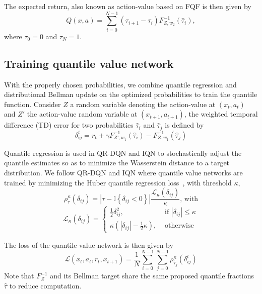 \documentclass{article}
\begin{document}
The expected return, also known as action-value based on FQF is then given by
\begin{equation*}
    Q(x, a)=\sum_{i=0}^{N-1}(\tau_{i+1}-\tau_{i})F^{-1}_{Z,w_2}(\hat{\tau}_i),
\end{equation*}
where $\tau_0=0$ and $\tau_{N}=1$.

\subsection{Training quantile value network}
With the properly chosen probabilities, we combine quantile regression and distributional Bellman update on the optimized probabilities to train the quantile function. Consider $Z$ a random variable denoting the action-value at $(x_t,a_t)$ and $Z'$ the action-value random variable at $(x_{t+1},a_{t+1})$, the weighted temporal difference (TD) error for two probabilities $\hat{\tau}_i$ and $\hat{\tau}_j$ is defined by
\begin{equation}
    \delta_{ij}^t=r_t+\gamma F^{-1}_{Z',w_1}(\hat{\tau}_i)-F^{-1}_{Z,w_1}(\hat{\tau}_j)
\end{equation}

Quantile regression is used in QR-DQN and IQN to stochastically adjust the quantile estimates so as to minimize the Wasserstein distance to a target distribution. We follow QR-DQN and IQN where quantile value networks are trained by minimizing the Huber quantile regression loss~\citep{huber:1964}, with threshold $\kappa$,
\begin{equation*}
    \rho_{\tau}^{\kappa}\left(\delta_{i j}\right)=\left|\tau-\mathbb{I}\left\{\delta_{i j}<0\right\}\right| \frac{\mathcal{L}_{\kappa}\left(\delta_{i j}\right)}{\kappa} \text{, with}
\end{equation*}
\begin{equation*}
    \mathcal{L}_{\kappa}\left(\delta_{i j}\right)=\left\{\begin{array}{ll}{\frac{1}{2} \delta_{i j}^{2},} & {\text { if }\left|\delta_{i j}\right| \leq \kappa} \\ {\kappa\left(\left|\delta_{i j}\right|-\frac{1}{2} \kappa\right),} & {\text { otherwise }}\end{array}\right.
\end{equation*}

The loss of the quantile value network is then given by
\begin{equation}
    \mathcal{L}(x_t, a_t, r_t, x_{t+1})=\frac{1}{N}\sum_{i=0}^{N-1}\sum_{j=0}^{N-1}\rho_{\hat{\tau}_j}^\kappa(\delta_{ij}^{t})
\end{equation}
Note that $F^{-1}_{Z}$ and its Bellman target share the same proposed quantile fractions $\hat{\tau}$ to reduce computation.
\end{document}
